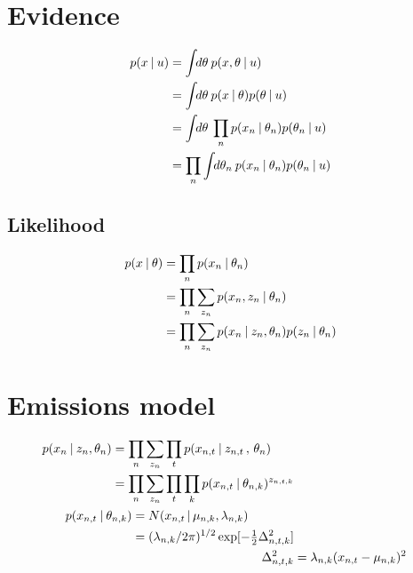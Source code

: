 \section{Evidence}
\begin{align}
  \begin{split}
  \p{x}{u} 
       &= \int \d{\theta} \p{x, \theta}{u} \\
       &= \int \d{\theta} \p{x}{\theta} \p{\theta}{u} \\ 
       &= \int \d{\theta} \prod_n \p{x_n}{\theta_n} \p{\theta_n}{u} \\ 
       &= \prod_n  \int \d{\theta_n} \p{x_n}{\theta_n} \p{\theta_n}{u}
  \end{split}  
\end{align}

\subsection{Likelihood}
\begin{align}
  \begin{split}
  p(x \:|\: \theta) &= \prod_n p(x_n \:|\: \theta_n) \\
                &= \prod_n \sum_{z_n} p(x_n , z_n \:|\: \theta_n) \\
                &= \prod_n \sum_{z_n} p(x_n \:|\: z_n, \theta_n) p(z_n \:|\: \theta_n)
  \end{split}
\end{align}

\section{Emissions model}
\begin{align}
  \begin{split}
  p(x_n \:|\: z_n, \theta_n) &= \prod_{n} \sum_{z_n} \prod_t 
                            p(x_{n,t} \:|\: z_{n,t} \,,\, \theta_{n}) \\
                         &= \prod_{n} \sum_{z_n} \prod_t \prod_k 
                            p(x_{n,t} \:|\: \theta_{n,k})^{z_{n,t,k}}
  \end{split}\\
  \begin{split}
    p(x_{n,t} \:|\: \theta_{n,k}) 
    &= N(x_{n,t} \,|\, \mu_{n,k}, \lambda_{n,k}) \\ 
    &= (\lambda_{n,k}/2\pi)^{1/2} \exp[-\tfrac{1}{2} \Delta_{n,t,k}^2] 
  \end{split} \\
  \Delta_{n,t,k}^2
  &= 
  \lambda_{n,k} (x_{n,t} - \mu_{n,k})^2
\end{align}

